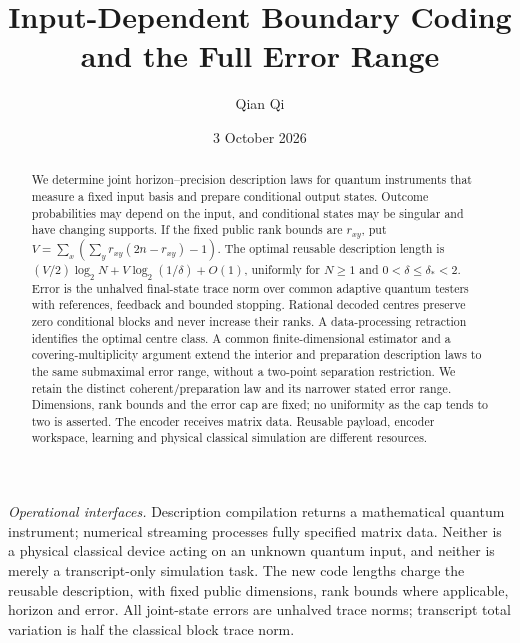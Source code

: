 \documentclass[11pt]{amsart}
\title[Input-dependent boundary coding]{Input-Dependent Boundary Coding\\and the Full Error Range}
\author{Qian Qi}
\date{3 October 2026}
\numberwithin{equation}{section}
\theoremstyle{definition}\newtheorem{definition}[theorem]{Definition}
\theoremstyle{remark}\newtheorem{remark}[theorem]{Remark}
\begin{document}
\raggedbottom
\begin{abstract}
We determine joint horizon--precision description laws for quantum
instruments that measure a fixed input basis and prepare conditional output
states. Outcome probabilities may depend on the input, and conditional
states may be singular and have changing supports. If the fixed public
rank bounds are $r_{xy}$, put
$V=\sum_x(\sum_y r_{xy}(2n-r_{xy})-1)$. The optimal reusable description
length is $(V/2)\log_2N+V\log_2(1/\delta)+O(1)$, uniformly for $N\ge1$
and $0<\delta\le\delta_*<2$. Error is the unhalved final-state trace
norm over common adaptive quantum testers with references, feedback and
bounded stopping. Rational decoded centres preserve zero conditional
blocks and never increase their ranks. A data-processing retraction
identifies the optimal centre class. A common finite-dimensional
estimator and a covering-multiplicity argument extend the interior and
preparation description laws to the same submaximal error range,
without a two-point separation restriction. We retain the distinct
coherent/preparation law and its narrower stated error range. Dimensions,
rank bounds and the error cap are fixed; no uniformity as the cap tends
to two is asserted. The encoder receives matrix data. Reusable payload,
encoder workspace, learning and physical classical simulation are
different resources.
\end{abstract}
\maketitle
\noindent\textit{Operational interfaces.}
Description compilation returns a mathematical quantum instrument;
numerical streaming processes fully specified matrix data. Neither is a
physical classical device acting on an unknown quantum input, and
neither is merely a transcript-only simulation task. The new code lengths
charge the reusable description, with fixed public dimensions, rank bounds where applicable, horizon and error.
All joint-state errors
are unhalved trace norms; transcript total variation is half the classical
block trace norm.














\end{document}
